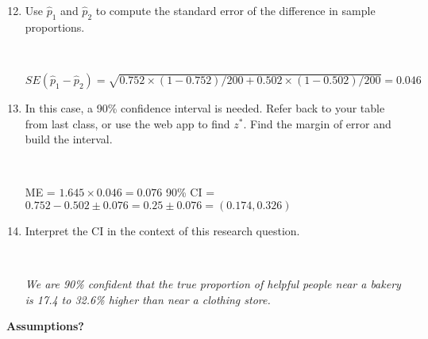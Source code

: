 \begin{enumerate}
  \setcounter{enumi}{11}
  \item Use $ \widehat{p}_1$ and $\widehat{p}_2$ to compute the standard
    error of the difference in sample proportions.
\begin{students}
  \vspace{2cm}\\
\end{students}
\begin{key}
$ SE(\widehat{p}_1 - \widehat{p}_2) = \sqrt{ 0.752\times(1- 0.752)/200
  + 0.502\times(1-  0.502)/200} =  0.046 $
\end{key}

\item In this case, a 90\% confidence interval is needed.  Refer back
  to your table from last class, or use the web app
  to find $z^*$.  Find the margin of error and   build the interval.
\begin{students}
 \vspace{1cm}\\
\end{students}
\begin{key}
ME = $ 1.645 \times 0.046 = 0.076 $ 90\% CI =  $0.752 - 0.502 \pm
0.076 = 0.25 \pm 0.076 = (0.174, 0.326)$
\end{key}

\item Interpret the CI in the context of this research question.
\begin{students}
 \vspace{1cm}\\
\vspace{1in}
\end{students}
\begin{key}
 {\it We are 90\% confident that the true proportion of helpful people
   near a bakery is 17.4 to 32.6\% higher than near a clothing store.}
\end{key}
\end{enumerate}

\begin{center}
  {\large\bf Assumptions?}
\end{center}

